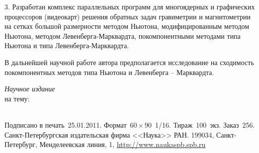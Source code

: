 \documentclass[%
autoref,     %
href,        %
facsimile,   %
colorlinks,  %
]{disser}
\begin{document}
3. Разработан комплекс параллельных программ для многоядерных и графических процессоров (видеокарт) решения обратных задач гравиметрии и магнитометрии на сетках большой размерности методом Ньютона, модифицированным методом Ньютона,  методом Левенберга-Марквардта, покомпонентными методами типа Ньютона и типа Левенберга-Марквардта.

В дальнейшей научной работе автора предполагается исследование на сходимость покомпонентных методов типа Ньютона и Левенберга -- Марквардта.

\printbibheading[title={Основные публикации по теме диссертации}]
\printbibliography[
heading=subbibliography,
keyword=hac,
title={Статьи в изданиях из перечня ВАК, SCOPUS}
]

\printbibliography[
heading=subbibliography,
keyword=nohac,
title={Другие публикации}
]

\clearpage
\thispagestyle{empty}
\normalfont\selectfont
\vspace*{2cm}
\begin{center}
\textit{Научное издание}\\
\vskip 2cm
\makeatletter
\@author
\vskip 1.5cm
\@title{} на тему:\\
\@topic\\
\makeatother
\end{center}
\vfill
Подписано в печать~25.01.2011.
Формат~$60 \times 90$~1/16.
Тираж~100~экз.
Заказ~256.\\[2ex]
\noindent
Санкт-Петербургская издательская фирма <<Наука>> РАН.
199034, Санкт-Петербург, Менделеевская линия, 1,
\href{http://www.naukaspb.spb.ru}{http://www.naukaspb.spb.ru}
\end{document}
